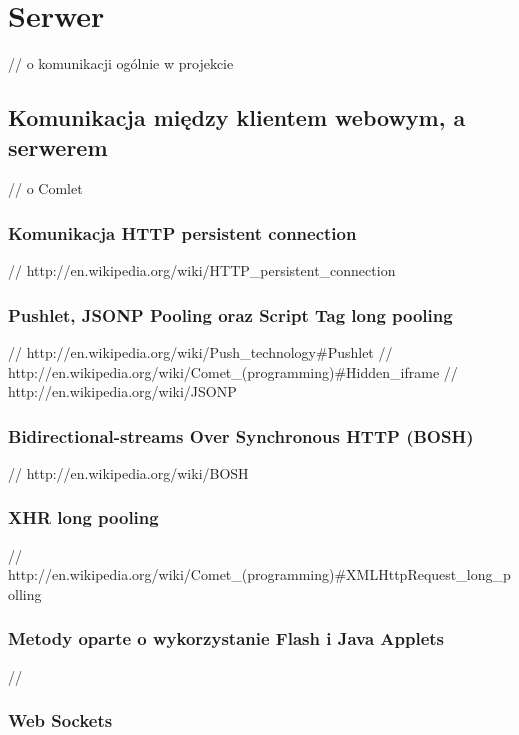 \section{Serwer}

// o komunikacji ogólnie w projekcie

\subsection{Komunikacja między klientem webowym, a serwerem}

// o Comlet

\subsubsection{Komunikacja HTTP persistent connection}

// http://en.wikipedia.org/wiki/HTTP_persistent_connection

\subsubsection{Pushlet, JSONP Pooling oraz Script Tag long pooling}

// http://en.wikipedia.org/wiki/Push_technology#Pushlet
// http://en.wikipedia.org/wiki/Comet_(programming)#Hidden_iframe
// http://en.wikipedia.org/wiki/JSONP

\subsubsection{Bidirectional-streams Over Synchronous HTTP (BOSH)}

// http://en.wikipedia.org/wiki/BOSH

\subsubsection{XHR long pooling}

// http://en.wikipedia.org/wiki/Comet_(programming)#XMLHttpRequest_long_polling

\subsubsection{Metody oparte o wykorzystanie Flash i Java Applets}

// 

\subsubsection{Web Sockets}

